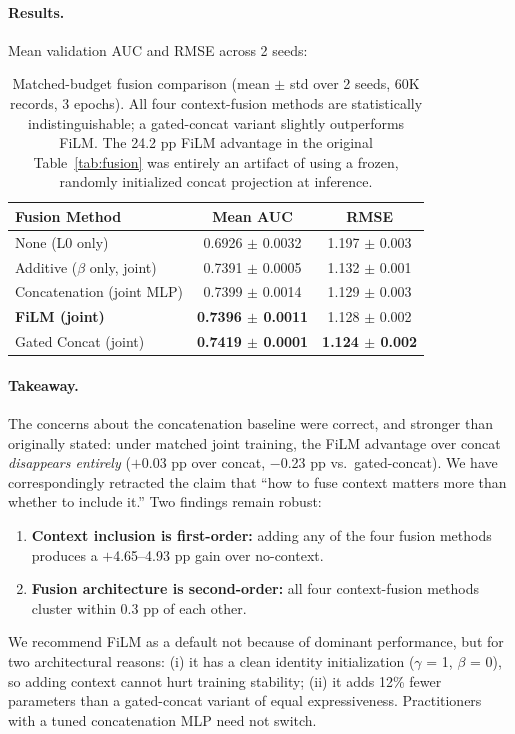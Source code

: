 \documentclass[sigconf]{acmart}
\begin{document}
\paragraph{Results.} Mean validation AUC and RMSE across 2 seeds:

\begin{table}[h]
\caption{Matched-budget fusion comparison (mean $\pm$ std over 2 seeds, 60K records, 3 epochs). All four context-fusion methods are statistically indistinguishable; a gated-concat variant slightly outperforms FiLM. The 24.2 pp FiLM advantage in the original Table~\ref{tab:fusion} was entirely an artifact of using a frozen, randomly initialized concat projection at inference.}
\label{tab:fair_fusion}
\centering
\small
\begin{tabular}{@{}lcc@{}}
\toprule
Fusion Method & Mean AUC & RMSE \\
\midrule
None (L0 only) & 0.6926 $\pm$ 0.0032 & 1.197 $\pm$ 0.003 \\
Additive ($\beta$ only, joint) & 0.7391 $\pm$ 0.0005 & 1.132 $\pm$ 0.001 \\
Concatenation (joint MLP) & 0.7399 $\pm$ 0.0014 & 1.129 $\pm$ 0.003 \\
\textbf{FiLM (joint)} & \textbf{0.7396 $\pm$ 0.0011} & 1.128 $\pm$ 0.002 \\
Gated Concat (joint) & \textbf{0.7419 $\pm$ 0.0001} & \textbf{1.124 $\pm$ 0.002} \\
\bottomrule
\end{tabular}
\end{table}

\paragraph{Takeaway.} The concerns about the concatenation baseline were correct, and stronger than originally stated: under matched joint training, the FiLM advantage over concat \emph{disappears entirely} ($+$0.03 pp over concat, $-$0.23 pp vs.\ gated-concat). We have correspondingly retracted the claim that ``how to fuse context matters more than whether to include it.'' Two findings remain robust:
\begin{enumerate}[noitemsep,topsep=1pt]
\item \textbf{Context inclusion is first-order:} adding any of the four fusion methods produces a $+$4.65--4.93 pp gain over no-context.
\item \textbf{Fusion architecture is second-order:} all four context-fusion methods cluster within 0.3 pp of each other.
\end{enumerate}
We recommend FiLM as a default not because of dominant performance, but for two architectural reasons: (i) it has a clean identity initialization ($\gamma$ = 1, $\beta$ = 0), so adding context cannot hurt training stability; (ii) it adds 12\% fewer parameters than a gated-concat variant of equal expressiveness. Practitioners with a tuned concatenation MLP need not switch.
\end{document}
